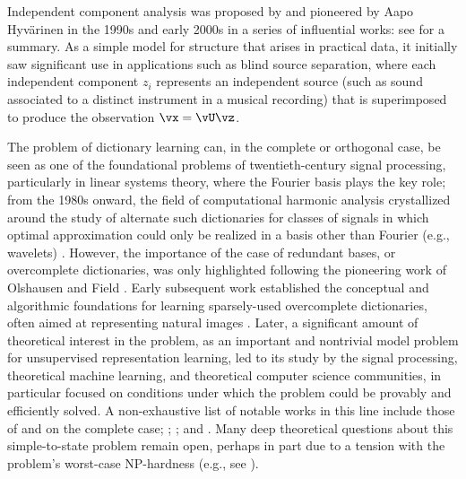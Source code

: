 \documentclass[../../book-main.tex]{subfiles}
\begin{document}
Independent component analysis was proposed by \textcite{Ans-1985}
and pioneered by
Aapo Hyv\"{a}rinen in the 1990s and early 2000s in a series of influential
works: see \textcite{Hyvrinen-2000} for a summary. As a simple model for
structure that arises in practical data, it initially saw significant use in
applications such as blind source separation, where each independent component
$z_i$ represents an independent source (such as sound associated to a distinct
instrument in a musical recording) that is superimposed to produce the
observation $\vx = \vU \vz$.

The problem of
dictionary learning can, in the complete or orthogonal case, be seen as one of
the foundational problems of twentieth-century signal processing, particularly
in linear systems theory, where the Fourier basis plays the key role; from the
1980s onward, the field of computational harmonic analysis crystallized around
the study of alternate such dictionaries for classes of signals in which optimal
approximation could only be realized in a basis other than Fourier
(e.g., wavelets)
\cite{Donoho1998-zf}. However, the importance of the case of redundant bases, or
overcomplete dictionaries, was only highlighted following the pioneering work of
Olshausen and Field \cite{Olshausen1996-ap,Olshausen1997-yv}. Early
subsequent work
established the conceptual and algorithmic foundations for learning
sparsely-used overcomplete dictionaries, often aimed at representing natural
images
\cite{Donoho2001-tl,DonohoD2003-PNAS,Elad2006-yi,Murray2007-cw,aharon2006k,Mairal2014-nq,Gribonval2015-fy}.
Later, a significant amount of theoretical interest in the problem, as an
important and nontrivial model problem for unsupervised representation learning,
led to its study by the signal processing, theoretical machine learning, and
theoretical computer science communities, in particular focused on conditions
under which the problem could be provably and efficiently solved.
A non-exhaustive list of notable works in this line include those of
\textcite{Spielman2012-tl} and \textcite{sun2017complete_a} on the complete
case; \textcite{pmlr-v40-Arora15}; \textcite{Barak2015-uu}; and
\textcite{Qu2020Geometric}. Many deep theoretical questions about this
simple-to-state problem remain open, perhaps in part due to a tension with the
problem's worst-case NP-hardness (e.g., see \textcite{Tillmann2015-up}).
\end{document}
